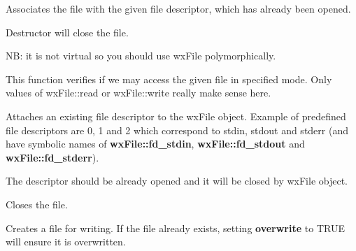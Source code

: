 Associates the file with the given file descriptor, which has already been opened.







Destructor will close the file.

NB: it is not virtual so you should use wxFile polymorphically.

\label{wxfileaccess}


This function verifies if we may access the given file in specified mode. Only
values of wxFile::read or wxFile::write really make sense here.

\label{wxfileattach}


Attaches an existing file descriptor to the wxFile object. Example of predefined
file descriptors are 0, 1 and 2 which correspond to stdin, stdout and stderr (and
have symbolic names of {\bf wxFile::fd\_stdin}, {\bf wxFile::fd\_stdout} and {\bf wxFile::fd\_stderr}).

The descriptor should be already opened and it will be closed by wxFile
object.

\label{wxfileclose}


Closes the file.

\label{wxfilecreate}


Creates a file for writing. If the file already exists, setting {\bf overwrite} to TRUE
will ensure it is overwritten.

\label{wxfiledetach}

